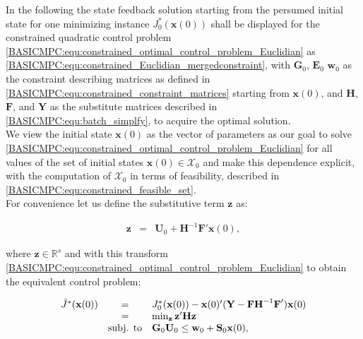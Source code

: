     In the following the state feedback solution starting from the persumed initial state for one minimizing instance $J^*_0(\textbf{x}(0))$ shall be displayed for the constrained quadratic control problem \ref{BASICMPC:equ:constrained_optimal_control_problem_Euclidian} as \ref{BASICMPC:equ:constrained_Euclidian_mergedconstraint}, with $\textbf{G}_0$, $\textbf{E}_0$ $\textbf{w}_0$ as the constraint describing matrices as defined in \ref{BASICMPC:equ:constrained_constraint_matrices} starting from $\textbf{x}(0)$, and $\textbf{H}$, $\textbf{F}$, and $\textbf{Y}$ as the substitute matrices described in \ref{BASICMPC:equ:batch_simplfy}, to acquire the optimal solution.\\
    We view the initial state $\textbf{x}(0)$ as the vector of parameters as our goal to solve \ref{BASICMPC:equ:constrained_optimal_control_problem_Euclidian} for all values of the set of initial states $\textbf{x}(0)\in\mathcal{X}_0$ and make this dependence explicit, with the computation of $\mathcal{X}_0$ in terms of feasibility, described in  \ref{BASICMPC:equ:constrained_feasible_set}.\\
    For convenience let us define the substitutive term $\textbf{z}$ as:

    \begin{equation}
    \begin{array}{rcl}
            \textbf{z}&=&\textbf{U}_0+\textbf{H}^{-1}\textbf{F}'\textbf{x}(0),
        \end{array}
        \label{BASICMPC:equ:constrained_substitute_z}
    \end{equation}

    where $\textbf{z}\in\mathbb{R}^s$ and with this transform \ref{BASICMPC:equ:constrained_optimal_control_problem_Euclidian} to obtain the equivalent control problem:

    \begin{equation}
    \begin{array}{rcl}
            \hat{J}^*(\textbf{x}(0))&=&J^*_0(\textbf{x}(0))-\textbf{x}(0)'(\textbf{Y}-\textbf{F}\textbf{H}^{-1}\textbf{F}')\textbf{x}(0)\\
            &=&\min_{\textbf{z}}\textbf{z}'\textbf{H}\textbf{z}\\
            &\textnormal{subj. to}&\textbf{G}_0\textbf{U}_0\leq\textbf{w}_0+\textbf{S}_0\textbf{x}(0),
        \end{array}
        \label{BASICMPC:equ:constrained_substitute_J}
    \end{equation}

